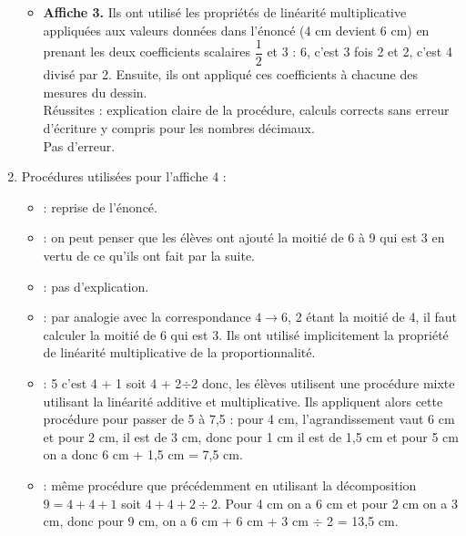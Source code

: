 \begin{corrige}
\begin{enumerate}
\begin{itemize}
            \item {\bf Affiche 3.} Ils ont utilisé les propriétés de linéarité multiplicative appliquées aux valeurs données dans l'énoncé (4 cm devient 6 cm) en prenant les deux coefficients scalaires $\dfrac12$  et 3 : 6, c'est 3 fois 2 et 2, c'est 4 divisé par 2. Ensuite, ils ont appliqué ces coefficients à chacune des mesures du dessin. \\
      Réussites : explication claire de la procédure, calculs corrects sans erreur d'écriture y compris pour les nombres décimaux. \\
      Pas d'erreur.
         \end{itemize}
      \item Procédures utilisées pour l'affiche 4 :
         \begin{itemize}
            \item {} : reprise de l'énoncé.
            \item {} : on peut penser que les élèves ont ajouté la moitié de 6 à 9 qui est 3 en vertu de ce qu'ils ont fait par la suite.
            \item {} : pas d'explication.
            \item {} : par analogie avec la correspondance $4\to6$, 2 étant la moitié de 4, il faut calculer la moitié de 6 qui est 3. Ils ont utilisé implicitement la propriété de linéarité multiplicative de la proportionnalité.
            \item {} : 5 c'est 4 + 1 soit 4 + 2$\div$2 donc, les élèves utilisent une procédure mixte utilisant la linéarité additive et multiplicative. Ils appliquent alors cette procédure pour passer de 5 à 7,5 : pour 4 cm, l'agrandissement vaut 6 cm et pour 2 cm, il est de 3 cm, donc pour 1 cm il est de 1,5 cm et pour 5 cm on a donc 6 cm + 1,5 cm = 7,5 cm.
            \item {} : même procédure que précédemment en utilisant la décomposition $9 = 4 + 4 + 1$ soit $4 + 4 + 2\div2$. Pour 4 cm on a 6 cm et pour 2 cm on a 3 cm, donc pour 9 cm, on a 6 cm + 6 cm + 3 cm $\div$ 2 = 13,5 cm.
         \end{itemize}
   \end{enumerate}
\end{corrige}


\Recreation %

\setcounter{exercice}{0}

